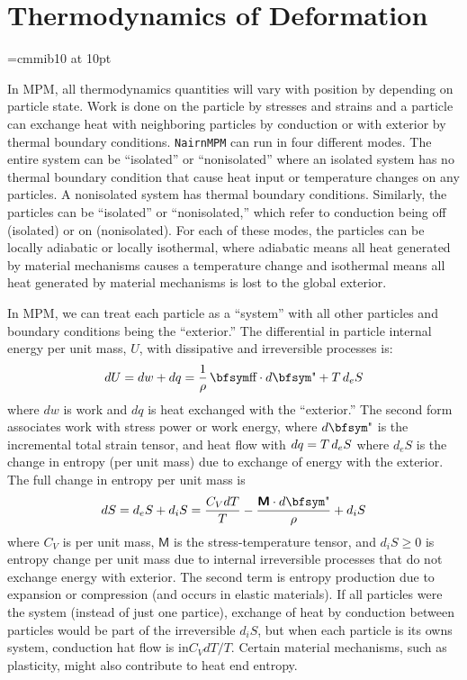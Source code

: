 \documentclass[11pt]{article}
\newcommand{\tens}[1]{\boldsymbol{\mathsf{#1}}}
\begin{document}
\section{Thermodynamics of Deformation}

\font\bfsym=cmmib10 at 10pt
\def\st{{\hbox{\bfsym\char'033}}}
\def\et{{\hbox{\bfsym\char'042}}}

In MPM, all thermodynamics quantities will vary with position by depending on particle state. Work is done on the particle by stresses and strains and a particle can exchange heat with neighboring particles by conduction or with exterior by thermal boundary conditions. {\tt NairnMPM} can run in four different modes. The entire system can be ``isolated'' or ``nonisolated'' where an isolated system has no thermal boundary condition that cause heat input or temperature changes on any particles. A nonisolated system has thermal boundary conditions. Similarly, the particles can be ``isolated'' or ``nonisolated,'' which refer to conduction being off (isolated) or on (nonisolated). For each of these modes, the particles can be locally adiabatic or locally isothermal, where adiabatic means all heat generated by material mechanisms causes a temperature change and isothermal means all heat generated by material mechanisms is lost to the global exterior.

In MPM, we can treat each particle as a ``system'' with all other particles and boundary conditions being the ``exterior.''
The differential in particle internal energy per unit mass, $U$, with dissipative and irreversible processes is:
\begin{equation}%
      dU = dw + dq = {1\over \rho}\thinspace \st\cdot d\et + T \thinspace d_eS
\end{equation}%
where $dw$ is work and $dq$ is heat exchanged with the ``exterior.'' The second form associates work with stress power or work energy, where $d\et$ is the incremental total strain tensor, and heat flow with $dq = T \thinspace d_eS$ where $d_eS$ is the change in entropy (per unit mass) due to exchange of energy with the exterior. The full change in entropy per unit mass is
\begin{equation}%
      dS = d_eS + d_iS = {C_V dT\over T} - {\tens{M}\cdot d\et\over \rho} + d_iS
\end{equation}%
where $C_V$ is per unit mass, $\tens{M}$ is the stress-temperature tensor, and $d_iS\ge0$ is entropy change per unit mass due to internal irreversible processes that do not exchange energy with exterior. The second term is entropy production due to expansion or compression (and occurs in elastic materials). If all particles were the system (instead of just one partice), exchange of heat by conduction between particles would be part of the irreversible $d_iS$, but when each particle is its owns system, conduction hat flow is in$C_VdT/T$. Certain material mechanisms, such as plasticity, might also contribute to heat end entropy.
\end{document}
